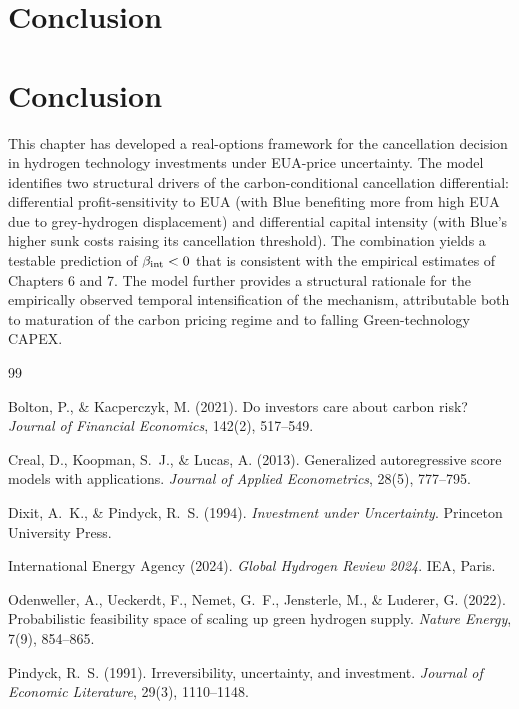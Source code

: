 \section{Conclusion}\section{Conclusion}
\label{sec:ch3-conclusion}

This chapter has developed a real-options framework for the cancellation decision in hydrogen technology investments under EUA-price uncertainty. The model identifies two structural drivers of the carbon-conditional cancellation differential: differential profit-sensitivity to EUA (with Blue benefiting more from high EUA due to grey-hydrogen displacement) and differential capital intensity (with Blue's higher sunk costs raising its cancellation threshold). The combination yields a testable prediction of $\beta_{\mathrm{int}} < 0$ that is consistent with the empirical estimates of Chapters 6 and 7. The model further provides a structural rationale for the empirically observed temporal intensification of the mechanism, attributable both to maturation of the carbon pricing regime and to falling Green-technology CAPEX.

\begin{thebibliography}{99}

Bolton, P., \& Kacperczyk, M. (2021).
\newblock Do investors care about carbon risk?
\newblock \textit{Journal of Financial Economics}, 142(2), 517--549.

Creal, D., Koopman, S.~J., \& Lucas, A. (2013).
\newblock Generalized autoregressive score models with applications.
\newblock \textit{Journal of Applied Econometrics}, 28(5), 777--795.

Dixit, A.~K., \& Pindyck, R.~S. (1994).
\newblock \textit{Investment under Uncertainty}.
\newblock Princeton University Press.

International Energy Agency (2024).
\newblock \textit{Global Hydrogen Review 2024}.
\newblock IEA, Paris.

Odenweller, A., Ueckerdt, F., Nemet, G.~F., Jensterle, M., \& Luderer, G. (2022).
\newblock Probabilistic feasibility space of scaling up green hydrogen supply.
\newblock \textit{Nature Energy}, 7(9), 854--865.

Pindyck, R.~S. (1991).
\newblock Irreversibility, uncertainty, and investment.
\newblock \textit{Journal of Economic Literature}, 29(3), 1110--1148.

\end{thebibliography}

